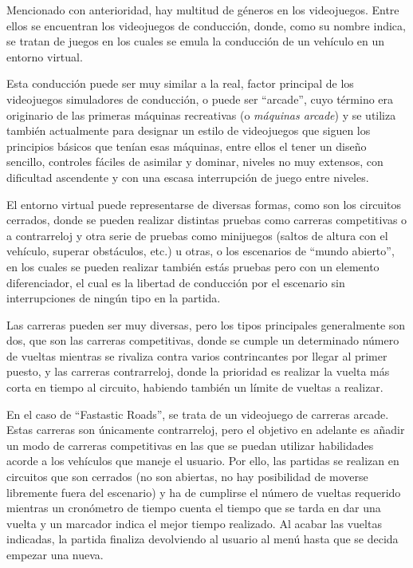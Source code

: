 Mencionado con anterioridad, hay multitud de géneros en los videojuegos. Entre ellos se encuentran los videojuegos de conducción, donde, como su nombre indica, se tratan de juegos en los cuales se emula la conducción de un vehículo en un entorno virtual. 

Esta conducción puede ser muy similar a la real, factor principal de los videojuegos simuladores de conducción, o puede ser ``arcade'', cuyo término era originario de las primeras máquinas recreativas (o \textit{máquinas arcade}) y se utiliza también actualmente para designar un estilo de videojuegos que siguen los principios básicos que tenían esas máquinas, entre ellos el tener un diseño sencillo, controles fáciles de asimilar y dominar, niveles no muy extensos, con dificultad ascendente y con una escasa interrupción de juego entre niveles.

El entorno virtual puede representarse de diversas formas, como son los circuitos cerrados, donde se pueden realizar distintas pruebas como carreras competitivas o a contrarreloj y otra serie de pruebas como minijuegos (saltos de altura con el vehículo, superar obstáculos, etc.) u otras, o los escenarios de ``mundo abierto'', en los cuales se pueden realizar también estás pruebas pero con un elemento diferenciador, el cual es la libertad de conducción por el escenario sin interrupciones de ningún tipo en la partida.

Las carreras pueden ser muy diversas, pero los tipos principales generalmente son dos, que son las carreras competitivas, donde se cumple un determinado número de vueltas mientras se rivaliza contra varios contrincantes por llegar al primer puesto, y las carreras contrarreloj, donde la prioridad es realizar la vuelta más corta en tiempo al circuito, habiendo también un límite de vueltas a realizar.

En el caso de ``Fastastic Roads'', se trata de un videojuego de carreras arcade. Estas carreras son únicamente contrarreloj, pero el objetivo en adelante es añadir un modo de carreras competitivas en las que se puedan utilizar habilidades acorde a los vehículos que maneje el usuario. Por ello, las partidas se realizan en circuitos que son cerrados (no son abiertas, no hay posibilidad de moverse libremente fuera del escenario) y ha de cumplirse el número de vueltas requerido mientras un cronómetro de tiempo cuenta el tiempo que se tarda en dar una vuelta y un marcador indica el mejor tiempo realizado. Al acabar las vueltas indicadas, la partida finaliza devolviendo al usuario al menú hasta que se decida empezar una nueva.

